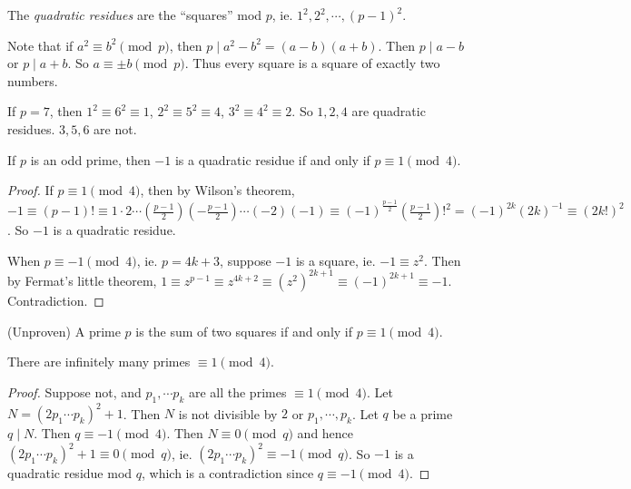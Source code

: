 \documentclass[a4paper]{article}
\begin{document}
\begin{defi}
  The \emph{quadratic residues} are the ``squares'' mod $p$, ie. $1^2, 2^2, \cdots, (p - 1)^2$.
\end{defi}

Note that if $a^2 \equiv b^2\pmod p$, then $p \mid a^2 - b^2 = (a - b)(a + b)$. Then $p \mid a - b$ or $p \mid a + b$. So $a\equiv \pm b\pmod p$. Thus every square is a square of exactly two numbers.

\begin{eg}
  If $p = 7$, then $1^2 \equiv 6^2 \equiv 1$, $2^2 \equiv 5^2 \equiv 4$, $3^2 \equiv 4^2 \equiv 2$. So $1, 2, 4$ are quadratic residues. $3, 5, 6$ are not.
\end{eg}

\begin{prop}
  If $p$ is an odd prime, then $-1$ is a quadratic residue if and only if $p\equiv 1\pmod 4$.
\end{prop}

\begin{proof}
  If $p \equiv 1 \pmod 4$, then by Wilson's theorem, $-1 \equiv (p - 1)!\equiv 1\cdot 2\cdots \left(\frac{p - 1}{2}\right)\left(-\frac{p - 1}{2}\right)\cdots (-2)(-1)\equiv (-1)^{\frac{p - 1}{2}}\left(\frac{p - 1}{2}\right)!^2 = (-1)^{2k}(2k)^{-1} \equiv (2k!)^2$. So $-1$ is a quadratic residue.

  When $p \equiv -1\pmod 4$, ie. $p = 4k + 3$, suppose $-1$ is a square, ie. $-1 \equiv z^2$. Then by Fermat's little theorem, $1\equiv z^{p - 1} \equiv z^{4k+ 2}\equiv (z^2)^{2k + 1} \equiv (-1)^{2k + 1}\equiv -1$. Contradiction.
\end{proof}
\begin{prop}
  (Unproven) A prime $p$ is the sum of two squares if and only if $p\equiv 1\pmod 4$.
\end{prop}

\begin{prop}
  There are infinitely many primes $\equiv 1\pmod 4$.
\end{prop}

\begin{proof}
  Suppose not, and $p_1, \cdots p_k$ are all the primes $\equiv 1\pmod 4$. Let $N = (2p_1\cdots p_k)^2 + 1$. Then $N$ is not divisible by $2$ or $p_1,\cdots, p_k$. Let $q$ be a prime $q \mid N$. Then $q \equiv -1\pmod 4$. Then $N \equiv 0\pmod q$ and hence $(2p_1\cdots p_k)^2 + 1\equiv 0\pmod q$, ie. $(2p_1\cdots p_k)^2 \equiv -1\pmod q$. So $-1$ is a quadratic residue mod $q$, which is a contradiction since $q \equiv -1\pmod 4$.
\end{proof}
\end{document}
